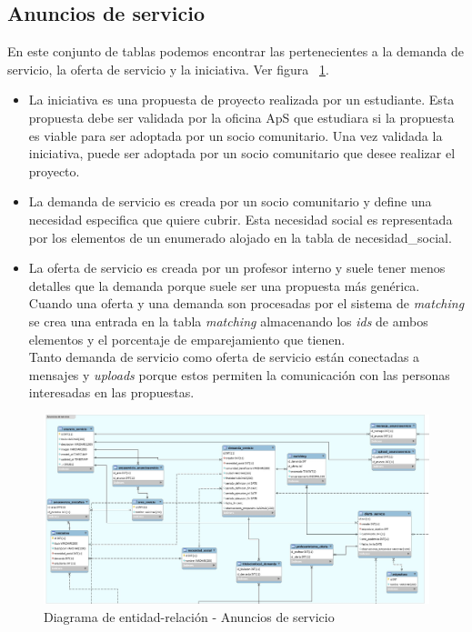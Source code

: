 \documentclass[11pt]{book}
\begin{document}
\subsection{Anuncios de servicio}
En este conjunto de tablas podemos encontrar las pertenecientes a la demanda de servicio, la oferta de servicio y la iniciativa. Ver figura ~\ref{fig:anuncios}.
\begin{itemize} 
	\item La iniciativa es una propuesta de proyecto realizada por un estudiante. Esta propuesta debe ser validada por la oficina ApS que estudiara si la propuesta es viable para ser adoptada por un socio comunitario. Una vez validada la iniciativa, puede ser adoptada por un socio comunitario que desee realizar el proyecto.
	\item La demanda de servicio es creada por un socio comunitario y define una necesidad especifica que quiere cubrir. Esta necesidad social es representada por los elementos de un enumerado alojado en la tabla de necesidad\_social.
	\item La oferta de servicio es creada por un profesor interno y suele tener menos detalles que la demanda porque suele ser una propuesta más genérica.\\
	Cuando una oferta y una demanda son procesadas por el sistema de \textit{matching} se crea una entrada en la tabla \textit{matching} almacenando los \textit{ids} de ambos elementos y el porcentaje de emparejamiento que tienen.\\
	Tanto demanda de servicio como oferta de servicio están conectadas a mensajes y \textit{uploads} porque estos permiten la comunicación con las personas interesadas en las propuestas.
\end{itemize}
\begin{figure}[t]
	\centering
	\includegraphics[scale=0.35]{anuncios}
	\caption{Diagrama de entidad-relación - Anuncios de servicio}
	\label{fig:anuncios}
\end{figure}
\end{document}
